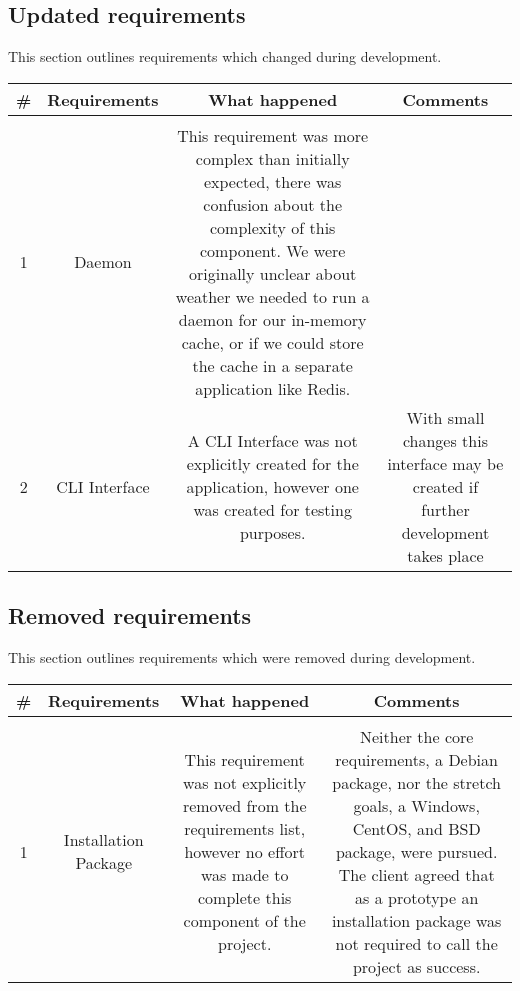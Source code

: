 \subsection{Updated requirements}

This section outlines requirements which changed during development.

\begin{center}
  \begin{tabular}{ c | c | c | c }
    \# & Requirements & What happened & Comments \\
    \hline \\
    1 & Daemon & This requirement was more complex than initially expected, there was confusion about the complexity of this component. We were originally unclear about weather we needed to run a daemon for our in-memory cache, or if we could store the cache in a separate application like Redis. & \\
    2 & CLI Interface & A CLI Interface was not explicitly created for the application, however one was created for testing purposes. & With small changes this interface may be created if further development takes place \\
  \end{tabular}
\end{center}

\subsection{Removed requirements}

This section outlines requirements which were removed during development.

\begin{center}
  \begin{tabular}{ c | c | c | c }
    \# & Requirements & What happened & Comments \\
    \hline \\
    1 & Installation Package &
      This requirement was not explicitly removed from the requirements list, however no effort was made to complete this component of the project. & 
      Neither the core requirements, a Debian package, nor the stretch goals, a Windows, CentOS, and BSD package, were pursued.
      The client agreed that as a prototype an installation package was not required to call the project as success. \\
  \end{tabular}
\end{center}
